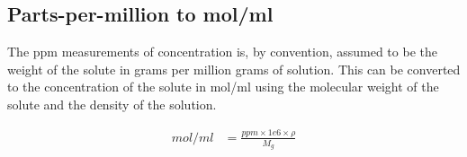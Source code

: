 \subsection{Parts-per-million to mol/ml}

The ppm measurements of concentration is, by convention, assumed to be the
weight of the solute in grams per million grams of solution. This can be
converted to the concentration of the solute in mol/ml using the molecular
weight of the solute and the density of the solution.

\begin{align*}
    mol/ml &= \frac{ppm \times 1e6 \times \rho}{M_g}
\end{align*}
